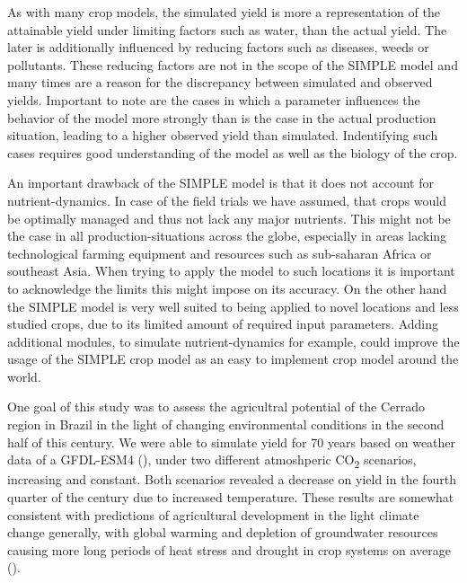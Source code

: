 \documentclass[a4paper,12pt,oneside]{article}
\begin{document}
As with many crop models, the simulated yield is more a representation of the attainable yield under limiting factors such as water, than the actual yield. The later is additionally influenced by reducing factors such as diseases, weeds or pollutants. These reducing factors are not in the scope of the SIMPLE model and many times are a reason for the discrepancy between simulated and observed yields. Important to note are the cases in which a parameter influences the behavior of the model more strongly than is the case in the actual production situation, leading to a higher observed yield than simulated. Indentifying such cases requires good understanding of the model as well as the biology of the crop.

An important drawback of the SIMPLE model is that it does not account for nutrient-dynamics. In case of the field trials we have assumed, that crops would be optimally managed and thus not lack any major nutrients. This might not be the case in all production-situations across the globe, especially in areas lacking technological farming equipment and resources such as sub-saharan Africa or southeast Asia. When trying to apply the model to such locations it is important to acknowledge the limits this might impose on its accuracy. On the other hand the SIMPLE model is very well suited to being applied to novel locations and less studied crops, due to its limited amount of required input parameters. Adding additional modules, to simulate nutrient-dynamics for example, could improve the usage of the SIMPLE crop model as an easy to implement crop model around the world.

One goal of this study was to assess the agricultral potential of the Cerrado region in Brazil in the light of changing environmental conditions in the second half of this century. We were able to simulate yield for 70 years based on weather data of a GFDL-ESM4 (\cite{dunne-2020-gfdl-earth}), under two different atmoshperic CO\textsubscript{2} scenarios, increasing and constant. Both scenarios revealed a decrease on yield in the fourth quarter of the century due to increased temperature. These results are somewhat consistent with predictions of agricultural development in the light climate change generally, with global warming and depletion of groundwater resources causing more long periods of heat stress and drought in crop systems on average (\cite{poertner-2022-climat-chang}).
\end{document}
